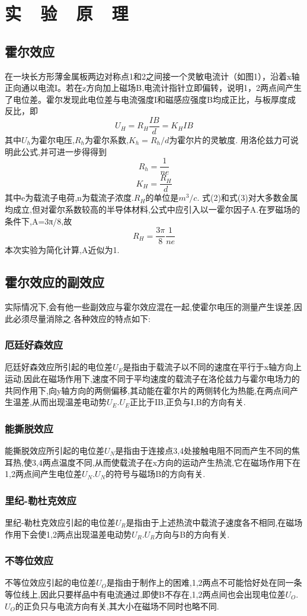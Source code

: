 \documentclass{thuemp}
\begin{document}
\section{实~~验~~原~~理}
\subsection{霍尔效应}
在一块长方形薄金属板两边对称点1和2之间接一个灵敏电流计（如图1），沿着x轴
正向通以电流I。若在z方向加上磁场B,电流计指针立即偏转，说明1，2两点间产生
了电位差。霍尔发现此电位差与电流强度I和磁感应强度B均成正比，与板厚度成反比，即
\[U_{H}=R_{H}\frac{IB}{d}=K_{H}IB\]
其中$U_{h}$为霍尔电压,$R_{h}$为霍尔系数,$K_{h}=R_{h}/d$为霍尔片的灵敏度.
用洛伦兹力可说明此公式,并可进一步得得到
\[R_{h}=\frac{1}{ne}\]
\[K_{H}=\frac{R_{H}}{d}\]
其中e为载流子电荷,n为载流子浓度.$R_{H}$的单位是$m^{3}/c$.
式(2)和式(3)对大多数金属均成立,但对霍尔系数较高的半导体材料,公式中应引入以一霍尔因子A.在罗磁场的条件下,A=3π/8,故
\[R_{H}=\frac{3\pi}{8}\frac{1}{ne}\]
本次实验为简化计算,A近似为1.
\subsection{霍尔效应的副效应}
实际情况下,会有他一些副效应与霍尔效应混在一起,使霍尔电压的测量产生误差,因此必须尽量消除之.各种效应的特点如下:
\subsubsection{厄廷好森效应}
厄廷好森效应所引起的电位差$U_{E}$是指由于载流子以不同的速度在平行于x轴方向上运动,因此在磁场作用下,速度不同于平均速度的载流子在洛伦兹力与霍尔电场力的共同作用下,向y轴方向的两侧偏移,其动能在霍尔片的两侧转化为热能,在两点间产生温差,从而出现温差电动势$U_{E}$.$U_{E}$正比于IB,正负与I,B的方向有关.
\subsubsection{能撕脱效应}
能撕脱效应所引起的电位差$U_{N}$是指由于连接点3,4处接触电阻不同而产生不同的焦耳热,使3,4两点温度不同,从而使载流子在x方向的运动产生热流,它在磁场作用下在1,2两点间产生电位差$U_{N}$.$U_{N}$的符号与磁场B的方向有关.
\subsubsection{里纪-勒杜克效应}
里纪-勒杜克效应引起的电位差$U_{R}$是指由于上述热流中载流子速度各不相同,在磁场作用下会使1,2两点出现温差电动势$U_{R}$.$U_{R}$方向与B的方向有关.
\subsubsection{不等位效应}
不等位效应引起的电位差$U_{O}$是指由于制作上的困难,1,2两点不可能恰好处在同一条等位线上,因此只要样品中有电流通过,即使B不存在,1,2两点间也会出现电位差$U_{O}$.$U_{O}$的正负只与电流方向有关,其大小在磁场不同时也略不同.
\end{document}
